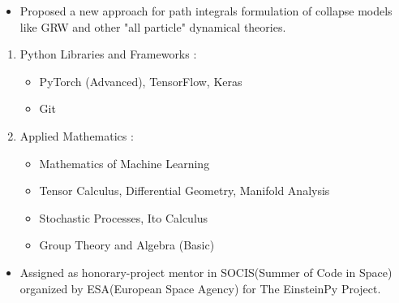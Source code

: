 \documentclass[10pt,a4paper,ragged2e]{altacv}
\begin{document}
\divider

\begin{itemize}
\item Proposed a new approach for path integrals formulation of collapse models like GRW and other "all particle" dynamical theories.
\end{itemize}





\begin{enumerate}
\item Python Libraries and Frameworks :
  \begin{itemize}
    \item PyTorch (Advanced), TensorFlow, Keras
  \end{itemize}
  \begin{itemize}
    \item Git
  \end{itemize}
\item Applied Mathematics :
  \begin{itemize}
    \item Mathematics of Machine Learning
  \end{itemize}
  \begin{itemize}
    \item Tensor Calculus, Differential Geometry, Manifold Analysis
  \end{itemize}
  \begin{itemize}
    \item Stochastic Processes, Ito Calculus
  \end{itemize}
  \begin{itemize}
    \item Group Theory and Algebra (Basic)
  \end{itemize}
\end{enumerate}






\begin{itemize}
\item Assigned as honorary-project mentor in SOCIS(Summer of Code in Space) organized by ESA(European Space Agency) for The EinsteinPy Project.
\end{itemize}
\end{document}

